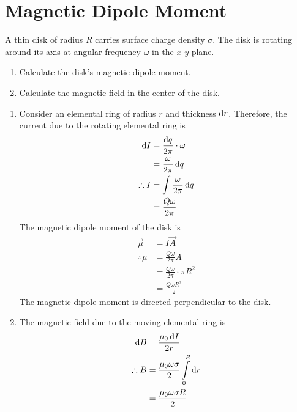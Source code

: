 \documentclass[fleqn, a4paper, 12pt, twoside]{article}
\theoremstyle{definition}
\theoremstyle{theorem}
\begin{document}
\section{Magnetic Dipole Moment}

\addtocounter{question}{1}

\begin{question}
	A thin disk of radius $R$ carries surface charge density $\sigma$.
	The disk is rotating around its axis at angular frequency $\omega$ in the $x$-$y$ plane.
	\begin{enumerate}
		\item Calculate the disk's magnetic dipole moment.
		\item Calculate the magnetic field in the center of the disk.
	\end{enumerate}
\end{question}

\begin{solution}
	\begin{enumerate}[leftmargin = *]
		\item
			Consider an elemental ring of radius $r$ and thickness $\dif r$.
			Therefore, the current due to the rotating elemental ring is
			\begin{align*}
				\dif I       & = \frac{\dif q}{2 \pi} \cdot \omega \\
                                             & = \frac{\omega}{2 \pi} \dif q       \\
				\therefore I & = \int \frac{\omega}{2 \pi} \dif q  \\
                                             & = \frac{Q \omega}{2 \pi}
			\end{align*}
			The magnetic dipole moment of the disk is
			\begin{align*}
				\overrightarrow{\mu} & = I \overrightarrow{A}                 \\
				\therefore \mu       & = \frac{Q \omega}{2 \pi} A             \\
                                                     & = \frac{Q \omega}{2 \pi} \cdot \pi R^2 \\
                                                     & = \frac{Q \omega R^2}{2}
			\end{align*}
			The magnetic dipole moment is directed perpendicular to the disk.
		\item
			The magnetic field due to the moving elemental ring is
			\begin{align*}
				\dif B       & = \frac{\mu_0 \dif I}{2 r}                                 \\
				\therefore B & = \frac{\mu_0 \omega \sigma}{2} \int\limits_{0}^{R} \dif r \\
                                             & = \frac{\mu_0 \omega \sigma R}{2}
			\end{align*}
	\end{enumerate}
\end{solution}
\end{document}
